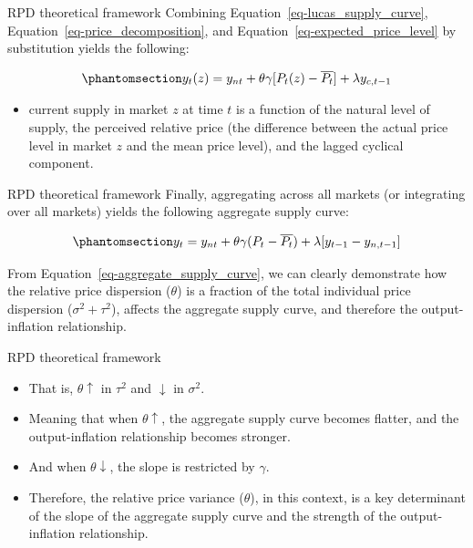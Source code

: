 \documentclass[
  ignorenonframetext,
]{beamer}
\providecommand{\tightlist}{%
  \setlength{\itemsep}{0pt}\setlength{\parskip}{0pt}}\usepackage{longtable,booktabs,array}
\begin{document}
\begin{frame}{RPD theoretical framework}
\label{rpd-theoretical-framework-10}
Combining Equation~\ref{eq-lucas_supply_curve},
Equation~\ref{eq-price_decomposition}, and
Equation~\ref{eq-expected_price_level} by substitution yields the
following:

\begin{equation}\phantomsection\label{eq-lucas_supply_curve_final}{ y_t(z) = y_{nt} + \theta \gamma[P_t(z) - \overline{P_t}] + \lambda y_{c, t-1}}\end{equation}

\begin{itemize}
\tightlist
\item
  current supply in market \(z\) at time \(t\) is a function of the
  natural level of supply, the perceived relative price (the difference
  between the actual price level in market \(z\) and the mean price
  level), and the lagged cyclical component.
\end{itemize}
\end{frame}

\begin{frame}{RPD theoretical framework}
\label{rpd-theoretical-framework-11}
Finally, aggregating across all markets (or integrating over all
markets) yields the following aggregate supply curve:

\begin{equation}\phantomsection\label{eq-aggregate_supply_curve}{y_t = y_{nt} + \theta\gamma(P_t - \overline{P_t}) + \lambda[y_{t-1} - y_{n, t-1}]}\end{equation}

From Equation~\ref{eq-aggregate_supply_curve}, we can clearly
demonstrate how the relative price dispersion (\(\theta\)) is a fraction
of the total individual price dispersion (\(\sigma^2 + \tau^2\)),
affects the aggregate supply curve, and therefore the output-inflation
relationship.
\end{frame}

\begin{frame}{RPD theoretical framework}
\label{rpd-theoretical-framework-12}
\begin{itemize}
\tightlist
\item
  That is, \(\theta \uparrow\) in \(\tau^2\) and \(\downarrow\) in
  \(\sigma^2\).
\item
  Meaning that when \(\theta \uparrow\), the aggregate supply curve
  becomes flatter, and the output-inflation relationship becomes
  stronger.
\item
  And when \(\theta\downarrow\), the slope is restricted by \(\gamma\).
\item
  Therefore, the relative price variance (\(\theta\)), in this context,
  is a key determinant of the slope of the aggregate supply curve and
  the strength of the output-inflation relationship.
\end{itemize}
\end{frame}
\end{document}
